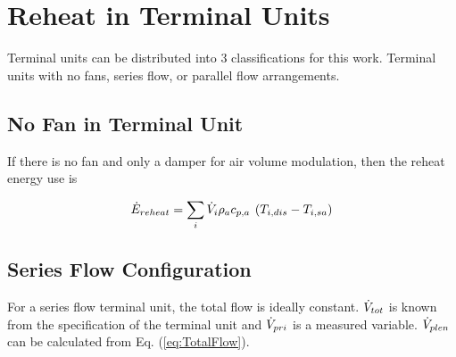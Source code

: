 
\section{Reheat in Terminal Units}

Terminal units can be distributed into 3 classifications for this work.
Terminal units with no fans, series flow, or parallel flow arrangements.

\subsection{No Fan in Terminal Unit}

If there is no fan and only a damper for air volume modulation, then the reheat
energy use is

\begin{equation} \label{eq:ReheatEnergy}
    {\dot E_{reheat}} = \sum\limits_i {{\dot{V}_{i}}\rho_a c_{p,a}\:\left( {{T_{i,dis}} - {T_{i,sa}}} \right)}
\end{equation}

\subsection{Series Flow Configuration}

For a series flow terminal unit, the total flow is ideally constant.
\(\dot{V}_{tot}\) is known from the specification of the terminal unit and
\(\dot{V}_{pri}\) is a measured variable. \(\dot{V}_{plen}\) can be calculated from
Eq. (\ref{eq:TotalFlow}).

